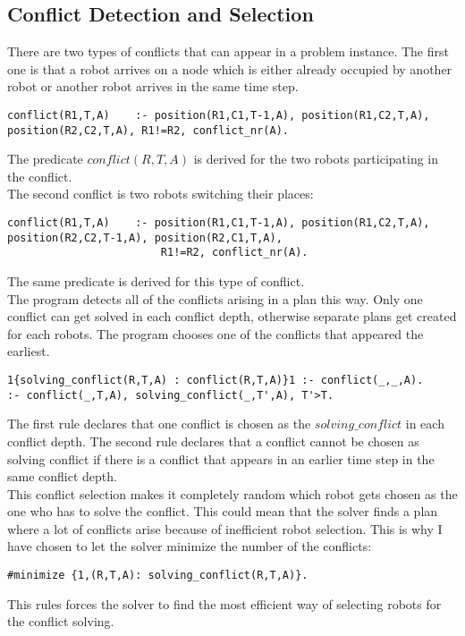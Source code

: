 \documentclass[runningheads]{llncs}
\begin{document}
\subsection{Conflict Detection and Selection}
There are two types of conflicts that can appear in a problem instance. The first one is that a robot arrives on a node which is either already occupied by another robot or another robot arrives in the same time step. 
\begin{verbatim}
conflict(R1,T,A)	:- position(R1,C1,T-1,A), position(R1,C2,T,A), position(R2,C2,T,A), R1!=R2, conflict_nr(A).
\end{verbatim}
The predicate $conflict(R,T,A)$ is derived for the two robots participating in the conflict. \\
The second conflict is two robots switching their places:
\begin{verbatim}
conflict(R1,T,A)	:- position(R1,C1,T-1,A), position(R1,C2,T,A), position(R2,C2,T-1,A), position(R2,C1,T,A),
						R1!=R2, conflict_nr(A).
\end{verbatim}
The same predicate is derived for this type of conflict. \\
The program detects all of the conflicts arising in a plan this way. Only one conflict can get solved in each conflict depth, otherwise separate plans get created for each robots. The program chooses one of the conflicts that appeared the earliest.
\begin{verbatim}
1{solving_conflict(R,T,A) : conflict(R,T,A)}1 :- conflict(_,_,A).
:- conflict(_,T,A), solving_conflict(_,T',A), T'>T.
\end{verbatim}
The first rule declares that one conflict is chosen as the $solving\_conflict$ in each conflict depth. The second rule declares that a conflict cannot be chosen as solving conflict if there is a conflict that appears in an earlier time step in the same conflict depth. \\
This conflict selection makes it completely random which robot gets chosen as the one who has to solve the conflict. This could mean that the solver finds a plan where a lot of conflicts arise because of inefficient robot selection. This is why I have chosen to let the solver minimize the number of the conflicts:
\begin{verbatim}
#minimize {1,(R,T,A): solving_conflict(R,T,A)}.
\end{verbatim}
This rules forces the solver to find the most efficient way of selecting robots for the conflict solving.
\end{document}
